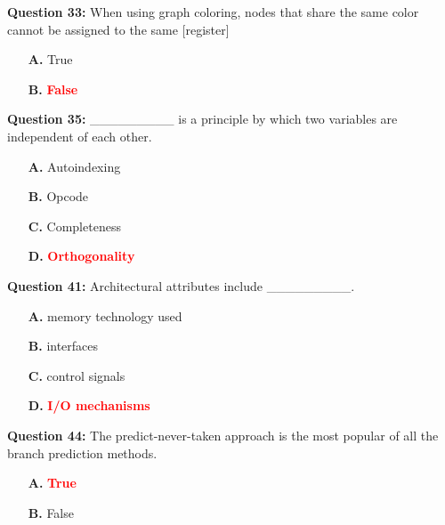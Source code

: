 \documentclass[12pt,a4paper]{article}
\begin{document}
\vspace{0.5cm}

\textbf{Question 33:} When using graph coloring, nodes that share the same color cannot be assigned to the same [register]

\begin{itemize}
    \item[\textbf{A.}] True
    \item[\textbf{B.}] \textcolor{red}{\textbf{False}}
\end{itemize}

\vspace{0.5cm}

\textbf{Question 35:} _________ is a principle by which two variables are independent of each other.

\begin{itemize}
    \item[\textbf{A.}] Autoindexing
    \item[\textbf{B.}] Opcode
    \item[\textbf{C.}] Completeness
    \item[\textbf{D.}] \textcolor{red}{\textbf{Orthogonality}}
\end{itemize}

\vspace{0.5cm}

\textbf{Question 41:} Architectural attributes include _________.

\begin{itemize}
    \item[\textbf{A.}] memory technology used
    \item[\textbf{B.}] interfaces
    \item[\textbf{C.}] control signals
    \item[\textbf{D.}] \textcolor{red}{\textbf{I/O mechanisms}}
\end{itemize}

\vspace{0.5cm}

\textbf{Question 44:} The predict-never-taken approach is the most popular of all the branch prediction methods.

\begin{itemize}
    \item[\textbf{A.}] \textcolor{red}{\textbf{True}}
    \item[\textbf{B.}] False
\end{itemize}

\vspace{0.5cm}
\end{document}
